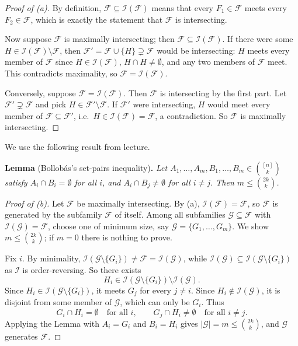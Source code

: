 \documentclass[a4paper,12pt]{article}
\newcommand{\card}[1]{\left| #1 \right|}
\newcommand{\mc}[1]{\mathcal{#1}}
\begin{document}
\begin{proof}[Proof of (a)]
	By definition, $\mc F \subseteq \mc I(\mc F)$ means that every $F_1 \in \mc F$ meets every $F_2 \in \mc F$, which is exactly the statement that $\mc F$ is intersecting.

	Now suppose $\mc F$ is maximally intersecting; then $\mc F \subseteq \mc I(\mc F)$. If there were some $H \in \mc I(\mc F) \setminus \mc F$, then $\mc F' = \mc F \cup \{H\} \supsetneq \mc F$ would be intersecting: $H$ meets every member of $\mc F$ since $H \in \mc I(\mc F)$, $H \cap H \neq \emptyset$, and any two members of $\mc F$ meet. This contradicts maximality, so $\mc F = \mc I(\mc F)$.

	Conversely, suppose $\mc F = \mc I(\mc F)$. Then $\mc F$ is intersecting by the first part. Let $\mc F' \supsetneq \mc F$ and pick $H \in \mc F' \setminus \mc F$. If $\mc F'$ were intersecting, $H$ would meet every member of $\mc F \subseteq \mc F'$, i.e.\ $H \in \mc I(\mc F) = \mc F$, a contradiction. So $\mc F$ is maximally intersecting.
\end{proof}

We use the following result from lecture.

\medskip
\noindent \textbf{Lemma} (Bollob\'as's set-pairs inequality)\textbf{.} \emph{Let $A_1, \hdots, A_m, B_1, \hdots, B_m \in \binom{[n]}{k}$ satisfy $A_i \cap B_i = \emptyset$ for all $i$, and $A_i \cap B_j \neq \emptyset$ for all $i \neq j$. Then $m \le \binom{2k}{k}$.}

\begin{proof}[Proof of (b)]
	Let $\mc F$ be maximally intersecting. By (a), $\mc I(\mc F) = \mc F$, so $\mc F$ is generated by the subfamily $\mc F$ of itself. Among all subfamilies $\mc G \subseteq \mc F$ with $\mc I(\mc G) = \mc F$, choose one of minimum size, say $\mc G = \{G_1, \hdots, G_m\}$. We show $m \le \binom{2k}{k}$; if $m = 0$ there is nothing to prove.

	Fix $i$. By minimality, $\mc I(\mc G \setminus \{G_i\}) \neq \mc F = \mc I(\mc G)$, while $\mc I(\mc G) \subseteq \mc I(\mc G \setminus \{G_i\})$ as $\mc I$ is order-reversing. So there exists
	\[
		H_i \in \mc I(\mc G \setminus \{G_i\}) \setminus \mc I(\mc G).
	\]
	Since $H_i \in \mc I(\mc G \setminus \{G_i\})$, it meets $G_j$ for every $j \neq i$. Since $H_i \notin \mc I(\mc G)$, it is disjoint from some member of $\mc G$, which can only be $G_i$. Thus
	\[
		G_i \cap H_i = \emptyset \quad \text{for all } i, \qquad G_j \cap H_i \neq \emptyset \quad \text{for all } i \neq j.
	\]
	Applying the Lemma with $A_i = G_i$ and $B_i = H_i$ gives $\card{\mc G} = m \le \binom{2k}{k}$, and $\mc G$ generates $\mc F$.
\end{proof}
\end{document}
